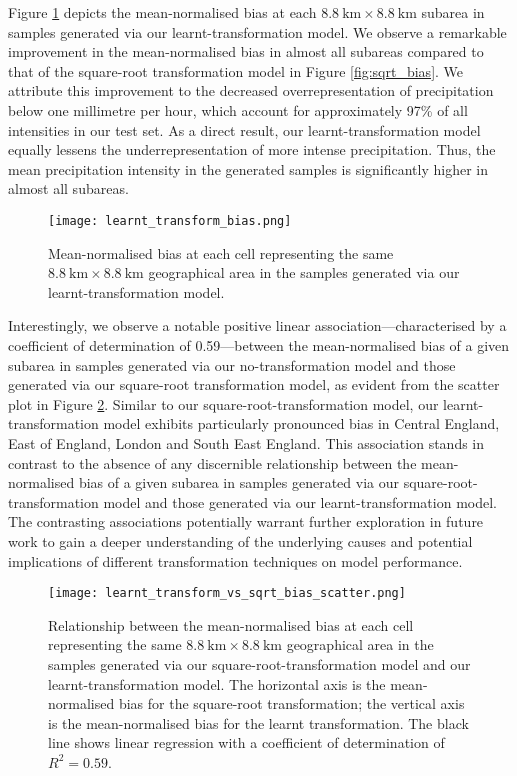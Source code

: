 \documentclass[ oneside,%
                    author={George Herbert},
                    degree={MSci},
                     title={Video Diffusion Models for Climate Simulations},
                  subtitle={}]{dissertation}
\begin{document}
Figure \ref{fig:learnt_transform_bias} depicts the mean-normalised bias at each $8.8\ \mathrm{km}\times 8.8\ \mathrm{km}$ subarea in samples generated via our learnt-transformation model. We observe a remarkable improvement in the mean-normalised bias in almost all subareas compared to that of the square-root transformation model in Figure \ref{fig:sqrt_bias}. We attribute this improvement to the decreased overrepresentation of precipitation below one millimetre per hour, which account for approximately 97\% of all intensities in our test set. As a direct result, our learnt-transformation model equally lessens the underrepresentation of more intense precipitation. Thus, the mean precipitation intensity in the generated samples is significantly higher in almost all subareas. 

\begin{figure}[htbp]
      \centering
      \texttt{[image: learnt\_transform\_bias.png]}
      \caption{Mean-normalised bias at each cell representing the same $8.8\ \mathrm{km}\times 8.8\ \mathrm{km}$ geographical area in the samples generated via our learnt-transformation model.}
      \label{fig:learnt_transform_bias}
\end{figure}

Interestingly, we observe a notable positive linear association---characterised by a coefficient of determination of 0.59---between the mean-normalised bias of a given subarea in samples generated via our no-transformation model and those generated via our square-root transformation model, as evident from the scatter plot in Figure \ref{fig:learnt_transform_vs_sqrt_bias_scatter}. Similar to our square-root-transformation model, our learnt-transformation model exhibits particularly pronounced bias in Central England, East of England, London and South East England. This association stands in contrast to the absence of any discernible relationship between the mean-normalised bias of a given subarea in samples generated via our square-root-transformation model and those generated via our learnt-transformation model. The contrasting associations potentially warrant further exploration in future work to gain a deeper understanding of the underlying causes and potential implications of different transformation techniques on model performance.

\begin{figure}[htbp]
      \centering
      \texttt{[image: learnt\_transform\_vs\_sqrt\_bias\_scatter.png]}
      \caption{Relationship between the mean-normalised bias at each cell representing the same $8.8\ \mathrm{km}\times 8.8\ \mathrm{km}$ geographical area in the samples generated via our square-root-transformation model and our learnt-transformation model. The horizontal axis is the mean-normalised bias for the square-root transformation; the vertical axis is the mean-normalised bias for the learnt transformation. The black line shows linear regression with a coefficient of determination of $R^2 = 0.59$.}
      \label{fig:learnt_transform_vs_sqrt_bias_scatter}
\end{figure}
\end{document}
